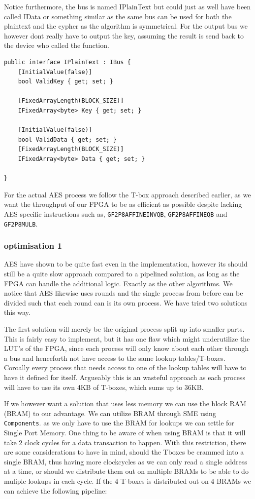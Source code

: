 \documentclass[a4paper]{article}
\begin{document}
\begin{enumerate}
Notice furthermore, the bus is named IPlainText but could just as well have been called IData or something similar as the same bus can be used for both the plaintext and the cypher as the algorithm is symmetrical. For the output bus we however dont really have to output the key, assuming the result is send back to the device who called the function.
\begin{verbatim}
public interface IPlainText : IBus {
    [InitialValue(false)]
    bool ValidKey { get; set; }

    [FixedArrayLength(BLOCK_SIZE)]
    IFixedArray<byte> Key { get; set; }

    [InitialValue(false)]
    bool ValidData { get; set; }
    [FixedArrayLength(BLOCK_SIZE)]
    IFixedArray<byte> Data { get; set; }

}
\end{verbatim}
For the actual AES process we follow the T-box approach described earlier, as we want the throughput of our FPGA to be as efficient as possible despite lacking AES specific instructions such as, \texttt{GF2P8AFFINEINVQB}, \texttt{GF2P8AFFINEQB} and \texttt{GF2P8MULB}.
\subsubsection{optimisation 1}
\label{AESopt}
AES have shown to be quite fast even in the implementation, however its should still be a quite slow approach compared to a pipelined solution, as long as the FPGA can handle the additional logic. Exactly as the other algorithms. We notice that AES likewise uses rounds and the single process from before can be divided such that each round can is its own process. We have tried two solutions this way.

The first solution will merely be the original process split up into smaller parts. This is fairly easy to implement, but it has one flaw which might underutilize the LUT's of the FPGA, since each process will only know about each other through a bus and henceforth not have access to the same lookup tables/T-boxes. Coroally every process that needs access to one of the lookup tables will have to have it defined for itself. Argueably this is an wasteful approach as each process will have to use its own 4KB of T-boxes, which sums up to 36KB.

If we however want a solution that uses less memory we can use the block RAM (BRAM) to our advantage. We can utilize BRAM through SME using \texttt{Components}. as we only have to use the BRAM for lookups we can settle for Single Port Memory. One thing to be aware of when using BRAM is that it will take 2 clock cycles for a data transaction to happen. With this restriction, there are some considerations to have in mind, should the Tboxes be crammed into a single BRAM, thus having more clockcycles as we can only read a single address at a time, or should we distribute them out on multiple BRAMs to be able to do muliple lookups in each cycle. If the 4 T-boxes is distributed out on 4 BRAMs we can achieve the following pipeline:

\end{enumerate}
\end{document}
